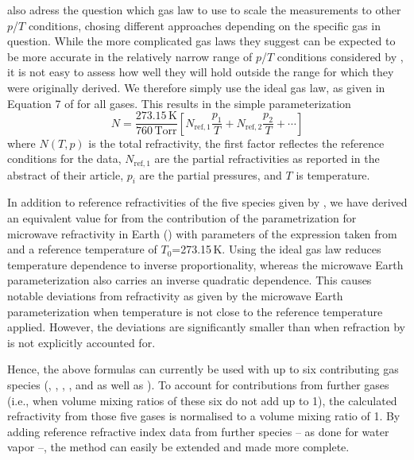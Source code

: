 \citet{newell65:_absolute_jap} also adress the question which gas law
to use to scale the measurements to other $p$/$T$ conditions, chosing different
approaches depending on the specific gas in question. While the more complicated
gas laws they suggest can be expected to be more
accurate in the relatively narrow range of $p$/$T$ conditions
considered by \citet{newell65:_absolute_jap}, it is not easy to
assess how well they will hold outside the range for which they were
originally derived. We therefore simply use the ideal gas
law, as given in Equation 7 of \citet{newell65:_absolute_jap} for all
gases. This results in the simple parameterization
\begin{equation}
  \label{eq:N_density2}
  N = \frac{273.15\,\mathrm{K}}{760\,\mathrm{Torr}}  
           \left[
           N_{\mathrm{ref},1} \frac{p_1}{T} + 
           N_{\mathrm{ref},2} \frac{p_2}{T} + \cdots
           \right]
\end{equation}
where $ N(T,p)$ is the total refractivity, the
first factor reflectes the reference conditions for the
\citet{newell65:_absolute_jap} data, $N_{\mathrm{ref},1}$ are the
partial refractivities as reported in the abstract of their
article, $p_i$ are the partial pressures, and $T$ is temperature.

In addition to reference refractivities of the five species given by
\citet{newell65:_absolute_jap}, we have derived an equivalent value for
 from the  contribution of the parametrization
for microwave refractivity in Earth ()
with parameters of the expression taken from \citet{bevis94:_gps_jam} and a
reference temperature of $T_0$=273.15\,K.
Using the ideal gas law reduces temperature dependence to inverse
proportionality, whereas the microwave Earth parameterization also
carries an inverse quadratic dependence. This causes notable deviations from
 refractivity as given by the microwave Earth parameterization when
temperature is not close to the reference temperature applied. However, the
deviations are significantly smaller than when refraction by  is not
explicitly accounted for.

Hence, the above formulas can currently be used with up to six contributing gas
species (, , , , and  as well
as ). To account for contributions from further gases
(i.e., when volume mixing ratios of these six do not add up to 1), the
calculated refractivity from those five gases is normalised to a volume mixing
ratio of 1. By adding reference refractive index data from further species -- as
done for water vapor --, the method can easily be extended and made more complete.

